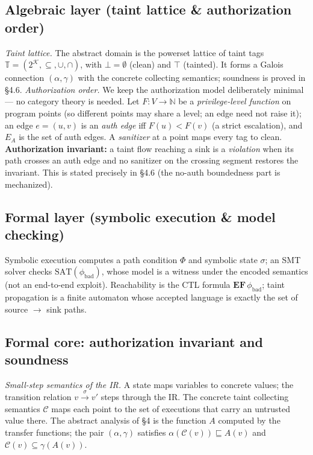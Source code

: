 \documentclass[11pt]{article}
\begin{document}
\subsection{Algebraic layer (taint lattice \& authorization order)}
\emph{Taint lattice.} The abstract domain is the powerset lattice of taint tags
$\mathbb{T} = (2^{\mathcal{K}}, \subseteq, \cup, \cap)$, with $\bot = \emptyset$
(clean) and $\top$ (tainted). It forms a Galois connection $(\alpha, \gamma)$
with the concrete collecting semantics; soundness is proved in \S4.6.
\emph{Authorization order.} We keep the authorization model deliberately minimal
--- no category theory is needed. Let $F : V \to \mathbb{N}$ be a
\emph{privilege-level function} on program points (so different points may share a
level; an edge need not raise it); an edge $e=(u,v)$ is an \emph{auth edge} iff
$F(u) < F(v)$ (a strict escalation), and $E_A$ is the set of auth edges. A
\emph{sanitizer} at a point maps every tag to clean. \textbf{Authorization
invariant:} a taint flow reaching a sink is a \emph{violation} when its path
crosses an auth edge and no sanitizer on the crossing segment restores the
invariant. This is stated precisely in \S4.6 (the no-auth boundedness part is
mechanized).

\subsection{Formal layer (symbolic execution \& model checking)}
Symbolic execution computes a path condition $\Phi$ and symbolic state $\sigma$;
an SMT solver checks $\mathrm{SAT}(\phi_{\text{bad}})$, whose model is
a witness under the encoded semantics (not an end-to-end exploit). Reachability is the CTL formula $\mathbf{EF}\,\phi_{\text{bad}}$;
taint propagation is a finite automaton whose accepted language is exactly the
set of source $\to$ sink paths.

\subsection{Formal core: authorization invariant and soundness}
\emph{Small-step semantics of the IR.} A state maps variables to
concrete values; the transition relation $v \xrightarrow{\sigma} v'$ steps
through the IR. The concrete taint collecting semantics $\mathcal{C}$ maps each
point to the set of executions that carry an untrusted value there. The abstract
analysis of \S4 is the function $A$ computed by the transfer functions; the
pair $(\alpha, \gamma)$ satisfies $\alpha(\mathcal{C}(v)) \sqsubseteq A(v)$ and
$\mathcal{C}(v) \subseteq \gamma(A(v))$.
\end{document}
